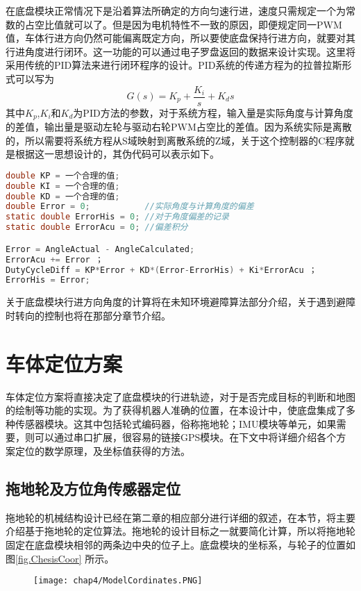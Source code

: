 在底盘模块正常情况下是沿着算法所确定的方向匀速行进，速度只需规定一个为常数的占空比值就可以了。但是因为电机特性不一致的原因，即便规定同一PWM值，车体行进方向仍然可能偏离既定方向，所以要使底盘保持行进方向，就要对其行进角度进行闭环。这一功能的可以通过电子罗盘返回的数据来设计实现。这里将采用传统的PID算法来进行闭环程序的设计。PID系统的传递方程为的拉普拉斯形式可以写为 \\
\begin{equation}
G(s)= K_p+\frac{K_i}{s}+K_ds
\end{equation}
其中$K_p$,$K_i$和$K_d$为PID方法的参数，对于系统方程，输入量是实际角度与计算角度的差值，输出量是驱动左轮与驱动右轮PWM占空比的差值。因为系统实际是离散的，所以需要将系统方程从S域映射到离散系统的Z域，关于这个控制器的C程序就是根据这一思想设计的，其伪代码可以表示如下。
\begin{lstlisting}[language={C}, caption={PID控制器伪代码}]
double KP = 一个合理的值;
double KI = 一个合理的值;
double KD = 一个合理的值;
double Error = 0;			//实际角度与计算角度的偏差
static double ErrorHis = 0;	//对于角度偏差的记录
static double ErrorAcu = 0;	//偏差积分

Error = AngleActual - AngleCalculated;
ErrorAcu += Error ；
DutyCycleDiff = KP*Error + KD*(Error-ErrorHis) + Ki*ErrorAcu ；
ErrorHis = Error;
\end{lstlisting}
关于底盘模块行进方向角度的计算将在未知环境避障算法部分介绍，关于遇到避障时转向的控制也将在那部分章节介绍。
\section{车体定位方案}
车体定位方案将直接决定了底盘模块的行进轨迹，对于是否完成目标的判断和地图的绘制等功能的实现。为了获得机器人准确的位置，在本设计中，使底盘集成了多种传感器模块。这其中包括轮式编码器，俗称拖地轮；IMU模块等单元，如果需要，则可以通过串口扩展，很容易的链接GPS模块。在下文中将详细介绍各个方案定位的数学原理，及坐标值获得的方法。

\subsection{拖地轮及方位角传感器定位}
拖地轮的机械结构设计已经在第二章的相应部分进行详细的叙述，在本节，将主要介绍基于拖地轮的定位算法。拖地轮的设计目标之一就要简化计算，所以将拖地轮固定在底盘模块相邻的两条边中央的位子上。底盘模块的坐标系，与轮子的位置如图\ref{fig.ChesisCoor} 所示。
\begin{figure}[!htp]
  \centering
  \texttt{[image: chap4/ModelCordinates.PNG]}
\end{figure}

